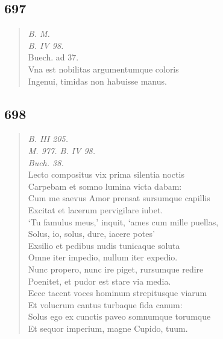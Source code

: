 \documentclass[11pt, a4paper]{report}
\begin{document}
            \subsection*{697}
      \begin{verse}
      \textit{B. M.} \\ \textit{B. IV 98.} \\ Buech. ad 37. \\ Vna est nobilitas argumentumque coloris \\ Ingenui, timidas non habuisse manus. \\ 
      \end{verse}
  
            \subsection*{698}
      \begin{verse}
      \textit{B. III 205.} \\ \textit{M. 977. B. IV 98.} \\ \textit{Buch. 38.} \\ Lecto compositus vix prima silentia noctis \\ Carpebam et somno lumina victa dabam: \\ Cum me saevus Amor prensat sursumque capillis \\ Excitat et lacerum pervigilare iubet. \\ ‘Tu famulus meus,’ inquit, ‘ames cum mille puellas, \\ Solus, io, solus, dure, iacere potes’ \\ Exsilio et pedibus nudis tunicaque soluta \\ Omne iter impedio, nullum iter expedio. \\ Nunc propero, nunc ire piget, rursumque redire \\ Poenitet, et pudor est stare via media. \\ Ecce tacent voces hominum strepitusque viarum \\ Et volucrum cantus turbaque fida canum: \\ Solus ego ex cunctis paveo somnumque torumque \\ Et sequor imperium, magne Cupido, tuum. \\ 
      \end{verse}
  
\end{document}
